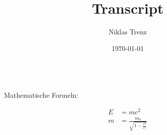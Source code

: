 \documentclass[a4paper,12pt]{article}
\title{Transcript}
\author{Niklas Trenz}
\date{\today}
\begin{document}
    \maketitle
    \tableofcontents

    
    \\
    Mathematische Formeln:

    \begin{align}
        E &= mc^2                   \\
        m &= \frac{m_0}{\sqrt{1-\frac{v^2}{c^2}}}
    \end{align}
\end{document}

